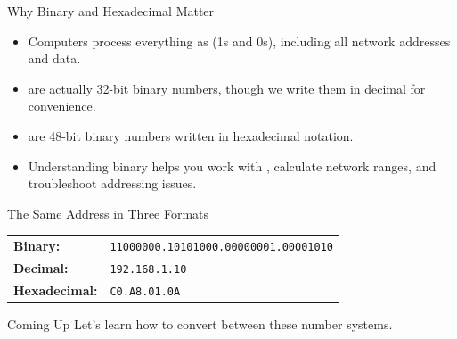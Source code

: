 \documentclass[aspectratio=169]{beamer}  %
\begin{document}

\begin{frame}{Why Binary and Hexadecimal Matter}
    \begin{itemize}
        \item Computers process everything as  (1s and 0s), including all network addresses and data.
        \item {} are actually 32-bit binary numbers, though we write them in decimal for convenience.
        \item {} are 48-bit binary numbers written in hexadecimal notation.
        \item Understanding binary helps you work with , calculate network ranges, and troubleshoot addressing issues.
    \end{itemize}
    
    \begin{exampleblock}{The Same Address in Three Formats}
        \centering
        \begin{tabular}{l l}
            \textbf{Binary:} & \texttt{11000000.10101000.00000001.00001010} \\
            \textbf{Decimal:} & \texttt{192.168.1.10} \\
            \textbf{Hexadecimal:} & \texttt{C0.A8.01.0A} \\
        \end{tabular}
    \end{exampleblock}
    
    \begin{block}{Coming Up}
        Let's learn how to convert between these number systems.
    \end{block}
\end{frame}
\end{document}
